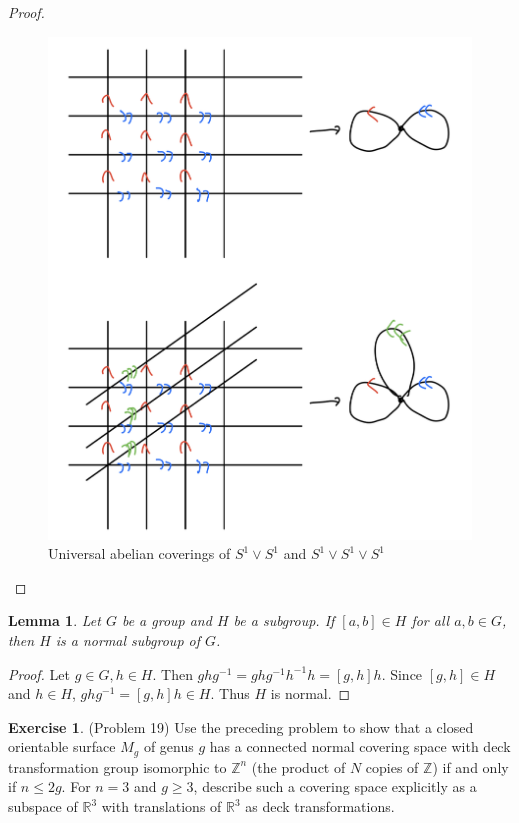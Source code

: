 \documentclass[12pt, psamsfonts]{amsart}
\newtheorem{lem}[thm]{Lemma}
\theoremstyle{definition}
\newtheorem*{exer}{Exercise}
\theoremstyle{remark}
\numberwithin{equation}{section}
\begin{document}
\begin{proof}
  \begin{figure}
    \includegraphics[width=.5\linewidth]{problem18_s1_s1.jpeg}
    \caption{Universal abelian coverings of $S^1 \vee S^1$ and $S^1 \vee S^1 \vee S^1$}
    \label{fig:problem18_s1_s1}
  \end{figure}
\end{proof}

\begin{lem}\label{lem1}
  Let $G$ be a group and $H$ be a subgroup.
  If $[a, b] \in H$ for all $a, b \in G$, then $H$ is a normal subgroup of $G$.
\end{lem}

\begin{proof}
  Let $g \in G, h \in H$.
  Then $ghg^{-1} = ghg^{-1}h^{-1}h = [g, h]h$.
  Since $[g, h] \in H$ and $h \in H$, $ghg^{-1} = [g, h]h \in H$.
  Thus $H$ is normal.
\end{proof}

\begin{exer}{(Problem 19)}
  Use the preceding problem to show that a closed orientable surface $M_g$ of genus $g$ has a connected normal covering space with deck transformation group isomorphic to $\mathbb{Z}^n$ (the product of $N$ copies of $\mathbb{Z}$) if and only if $n \leq 2g$.
  For $n = 3$ and $g \geq 3$, describe such a covering space explicitly as a subspace of $\mathbb{R}^3$ with translations of $\mathbb{R}^3$ as deck transformations.
\end{exer}
\end{document}

